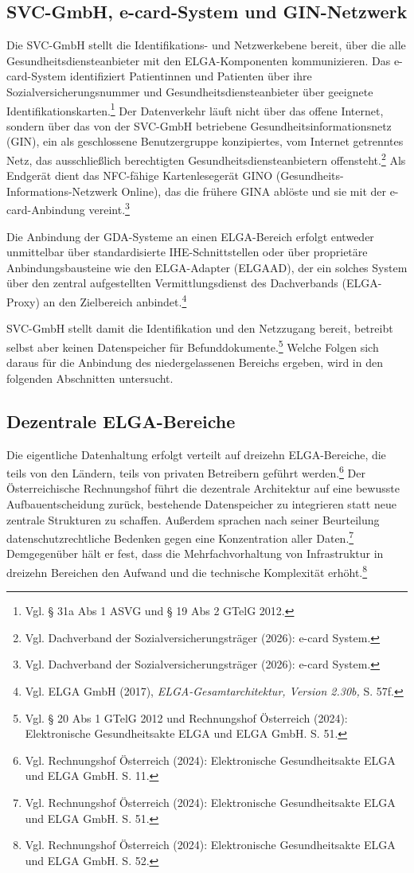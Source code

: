     \subsection{SVC-GmbH, e-card-System und GIN-Netzwerk}
Die SVC-GmbH stellt die Identifikations- und Netzwerkebene bereit, über die alle Gesundheitsdiensteanbieter mit den ELGA-Komponenten kommunizieren. Das e-card-System identifiziert Patientinnen und Patienten über ihre Sozialversicherungsnummer und Gesundheitsdiensteanbieter über geeignete Identifikationskarten.\footnote{Vgl. § 31a Abs 1 ASVG und § 19 Abs 2 GTelG 2012.} Der Datenverkehr läuft nicht über das offene Internet, sondern über das von der SVC-GmbH betriebene Gesundheitsinformationsnetz (GIN), ein als geschlossene Benutzergruppe konzipiertes, vom Internet getrenntes Netz, das ausschließlich berechtigten Gesundheitsdiensteanbietern offensteht.\footnote{Vgl. Dachverband der Sozialversicherungsträger (2026): e-card System.} Als Endgerät dient das NFC-fähige Kartenlesegerät GINO (Gesundheits-Informations-Netzwerk Online), das die frühere GINA ablöste und sie mit der e-card-Anbindung vereint.\footnote{Vgl. Dachverband der Sozialversicherungsträger (2026): e-card System.}

Die Anbindung der GDA-Systeme an einen ELGA-Bereich erfolgt entweder unmittelbar über standardisierte IHE-Schnittstellen oder über proprietäre Anbindungsbausteine wie den ELGA-Adapter (ELGAAD), der ein solches System über den zentral aufgestellten Vermittlungsdienst des Dachverbands (ELGA-Proxy) an den Zielbereich anbindet.\footnote{Vgl. ELGA GmbH (2017), \textit{ELGA-Gesamtarchitektur, Version 2.30b,} S. 57f.}

SVC-GmbH stellt damit die Identifikation und den Netzzugang bereit, betreibt selbst aber keinen Datenspeicher für Befunddokumente.\footnote{Vgl. § 20 Abs 1 GTelG 2012 und Rechnungshof Österreich (2024): Elektronische Gesundheitsakte ELGA und ELGA GmbH. S. 51.}
Welche Folgen sich daraus für die Anbindung des niedergelassenen Bereichs ergeben, wird in den folgenden Abschnitten untersucht.

    \subsection{Dezentrale ELGA-Bereiche}


Die eigentliche Datenhaltung erfolgt verteilt auf dreizehn ELGA-Bereiche, die teils von den Ländern, teils von privaten Betreibern geführt werden.\footnote{Vgl. Rechnungshof Österreich (2024): Elektronische Gesundheitsakte ELGA und ELGA GmbH. S. 11.} Der Österreichische Rechnungshof führt die dezentrale Architektur auf eine bewusste Aufbauentscheidung zurück, bestehende Datenspeicher zu integrieren statt neue zentrale Strukturen zu schaffen. Außerdem sprachen nach seiner Beurteilung datenschutzrechtliche Bedenken gegen eine Konzentration aller Daten.\footnote{Vgl. Rechnungshof Österreich (2024): Elektronische Gesundheitsakte ELGA und ELGA GmbH. S. 51.} Demgegenüber hält er fest, dass die Mehrfachvorhaltung von Infrastruktur in dreizehn Bereichen den Aufwand und die technische Komplexität erhöht.\footnote{Vgl. Rechnungshof Österreich (2024): Elektronische Gesundheitsakte ELGA und ELGA GmbH. S. 52.}

